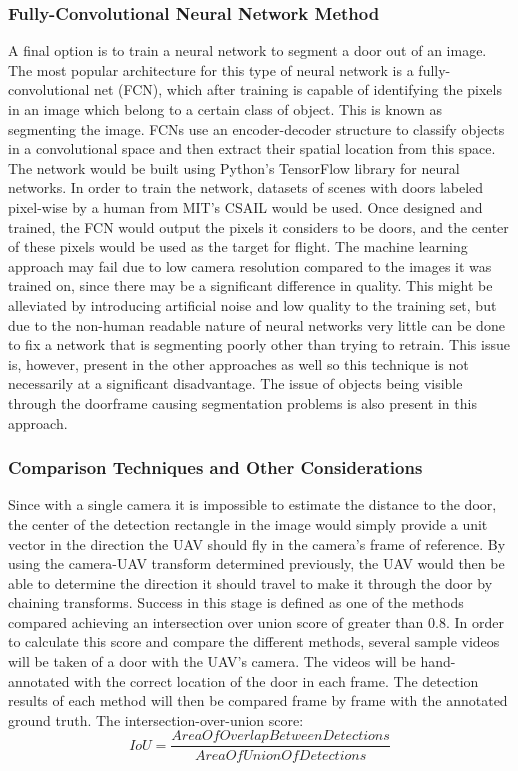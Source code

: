 \documentclass[12pt]{article}
\begin{document}
\subsubsection{Fully-Convolutional Neural Network Method}
A final option is to train a neural network to segment a door out of an image. The most popular architecture for this type of neural network is a fully-convolutional net (FCN), which after training is capable of identifying the pixels in an image which belong to a certain class of object. This is known as segmenting the image. FCNs use an encoder-decoder structure to classify objects in a convolutional space and then extract their spatial location from this space. The network would be built using Python's TensorFlow library for neural networks. In order to train the network, datasets of scenes with doors labeled pixel-wise by a human from MIT's CSAIL \cite{csail_data_2}\cite{csail_data_1}would be used. Once designed and trained, the FCN would output the pixels it considers to be doors, and the center of these pixels would be used as the target for flight. The machine learning approach may fail due to low camera resolution compared to the images it was trained on, since there may be a significant difference in quality. This might be alleviated by introducing artificial noise and low quality to the training set, but due to the non-human readable nature of neural networks very little can be done to fix a network that is segmenting poorly other than trying to retrain. This issue is, however, present in the other approaches as well so this technique is not necessarily at a significant disadvantage. The issue of objects being visible through the doorframe causing segmentation problems is also present in this approach.

\subsubsection{Comparison Techniques and Other Considerations}
Since with a single camera it is impossible to estimate the distance to the door, the center of the detection rectangle in the image would simply provide a unit vector in the direction the UAV should fly in the camera's frame of reference. By using the camera-UAV transform determined previously, the UAV would then be able to determine the direction it should travel to make it through the door by chaining transforms. Success in this stage is defined as one of the methods compared achieving an intersection over union score of greater than 0.8. In order to calculate this score and compare the different methods, several sample videos will be taken of a door with the UAV's camera. The videos will be hand-annotated with the correct location of the door in each frame. The detection results of each method will then be compared frame by frame with the annotated ground truth. The intersection-over-union score:
$$
IoU = \frac{AreaOfOverlapBetweenDetections}{AreaOfUnionOfDetections}
$$
\end{document}
